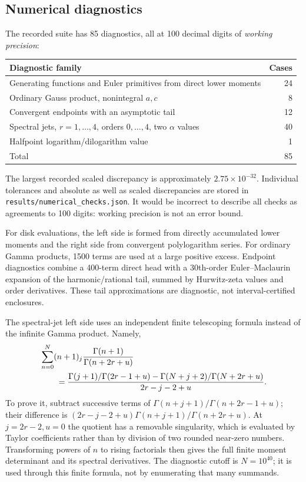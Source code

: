 \subsection{Numerical diagnostics}
The recorded suite has 85 diagnostics, all at 100 decimal digits of
\emph{working precision}:
\begin{center}
\small
\begin{tabular}{lr}
\toprule
Diagnostic family & Cases\\
\midrule
Generating functions and Euler primitives from direct lower moments & 24\\
Ordinary Gauss product, nonintegral $a,c$ & 8\\
Convergent endpoints with an asymptotic tail & 12\\
Spectral jets, $r=1,\ldots,4$, orders $0,\ldots,4$, two $\alpha$ values & 40\\
Halfpoint logarithm/dilogarithm value & 1\\
\midrule
Total & 85\\
\bottomrule
\end{tabular}
\end{center}
The largest recorded scaled discrepancy is approximately
$2.75\times10^{-32}$. Individual tolerances and absolute as well as
scaled discrepancies are stored in \texttt{results/numerical\_checks.json}.
It would be incorrect to describe all checks as agreements to 100
digits: working precision is not an error bound.

For disk evaluations, the left side is formed from directly accumulated
lower moments and the right side from convergent polylogarithm series.
For ordinary Gamma products, 1500 terms are used at a large positive
excess. Endpoint diagnostics combine a 400-term direct head with a
30th-order Euler--Maclaurin expansion of the harmonic/rational tail,
summed by Hurwitz-zeta values and order derivatives. These tail
approximations are diagnostic, not interval-certified enclosures.

The spectral-jet left side uses an independent finite telescoping
formula instead of the infinite Gamma product. Namely,
\begin{align}
 &\sum_{n=0}^N(n+1)_j
       \frac{\Gamma(n+1)}{\Gamma(n+2r+u)}\notag\\
 &\qquad=
 \frac{\Gamma(j+1)/\Gamma(2r-1+u)
             -\Gamma(N+j+2)/\Gamma(N+2r+u)}{2r-j-2+u}.
 \label{dhr:eq:finite-jet-telescope}
\end{align}
To prove it, subtract successive terms of
$\Gamma(n+j+1)/\Gamma(n+2r-1+u)$; their difference is
$(2r-j-2+u)\Gamma(n+j+1)/\Gamma(n+2r+u)$.
At $j=2r-2,u=0$ the quotient has a removable singularity, which
is evaluated by Taylor coefficients rather than by division of two
rounded near-zero numbers. Transforming powers of $n$ to rising
factorials then gives the full finite moment determinant and its
spectral derivatives. The diagnostic cutoff is $N=10^{40}$;
it is used through this finite formula, not by enumerating that
many summands.

